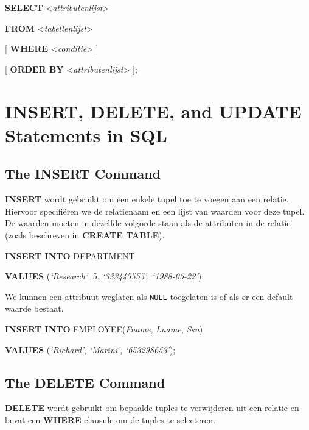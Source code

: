 \vspace{1mm}\hspace{10mm}
\textbf{SELECT} {\textless}\textit{attributenlijst}{\textgreater}

\hspace{10mm}
\textbf{FROM} {\textless}\textit{tabellenlijst}{\textgreater}

\hspace{10mm}
[ \textbf{WHERE} {\textless}\textit{conditie}{\textgreater} ]

\hspace{10mm}
[ \textbf{ORDER BY} {\textless}\textit{attributenlijst}{\textgreater} ];



\section{INSERT, DELETE, and UPDATE Statements in SQL}
\subsection{The INSERT Command}
\textbf{INSERT} wordt gebruikt om een enkele tupel toe te voegen aan een relatie. Hiervoor specifi\"eren we de relatienaam en een lijst van waarden voor deze tupel. De waarden moeten in dezelfde volgorde staan als de attributen in de relatie (zoals beschreven in \textbf{CREATE TABLE}).

\vspace{1mm}\hspace{10mm}
\textbf{INSERT INTO} DEPARTMENT

\hspace{10mm}
\textbf{VALUES} (\textit{`Research'}, 5, \textit{`333445555'}, \textit{`1988-05-22'});
\vspace{3mm}

\noindent We kunnen een attribuut weglaten als \texttt{NULL} toegelaten is of als er een default waarde bestaat.

\vspace{1mm}\hspace{10mm}
\textbf{INSERT INTO} EMPLOYEE(\textit{Fname}, \textit{Lname}, \textit{Ssn})

\hspace{10mm}
\textbf{VALUES} (\textit{`Richard'}, \textit{`Marini'}, \textit{`653298653'});



\subsection{The DELETE Command}
\textbf{DELETE} wordt gebruikt om bepaalde tuples te verwijderen uit een relatie en bevat een \textbf{WHERE}-clausule om de tuples te selecteren.

